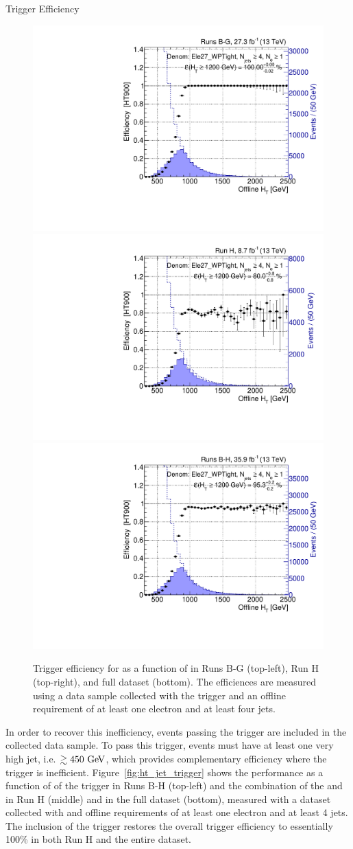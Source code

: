 \begin{section}{Trigger Efficiency}
\begin{figure}[tbp!]
\centering
\includegraphics[angle=0,width=0.45\columnwidth]{fig/trig_ht_runsbg.pdf}
\includegraphics[angle=0,width=0.45\columnwidth]{fig/trig_ht_runh.pdf}
\includegraphics[angle=0,width=0.45\columnwidth]{fig/trig_ht_runsbh.pdf}
\caption{Trigger efficiency for \trigHT as a function of \HT in Runs B-G (top-left), Run H (top-right), and full dataset (bottom). 
The efficiences are measured using a data sample collected with the \trigEle trigger and an offline requirement of at least one electron and at least four jets.}
\label{fig:ht_trigger}
\end{figure}

In order to recover this inefficiency, events passing the \trigJet trigger are included in the collected data sample.
To pass this trigger, events must have at least one very high \pT jet, i.e. $\gtrsim 450~\mathrm{Ge\kern -0.1em V}$, which provides complementary efficiency where the \trigHT trigger is inefficient.
Figure~\ref{fig:ht_jet_trigger} shows the performance as a function of \HT of the \trigJet trigger in Runs B-H (top-left) and the combination of the \trigHT and \trigJet in Run H (middle) and in the full dataset (bottom), measured with a dataset collected with \trigEle and offline requirements of at least one electron and at least 4 jets.
The inclusion of the \trigJet trigger restores the overall trigger efficiency to essentially 100\% in both Run H and the entire dataset.


\end{section}
